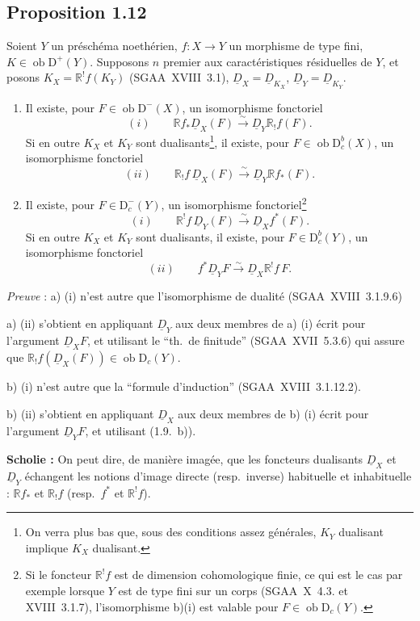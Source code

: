 \documentclass[11pt]{article}
\newcommand{\R}{\mathbb{R}}\newcommand{\RHomCore}{\mathbb{R}\mathrm{Hom}}
\newcommand{\D}{\mathrm{D}}
\newcommand{\ob}{\operatorname{ob}}
\providecommand{\ob}{\operatorname{ob}}
\providecommand{\R}{\mathrm R}
\begin{document}
\subsection*{Proposition 1.12}
Soient $Y$ un préschéma noethérien, $f : X \to Y$ un morphisme de type fini, $K \in \ob \D^{+}(Y)$. Supposons $n$ premier aux caractéristiques résiduelles de $Y$, et posons $K_X = \R^{!}f(K_Y)$ (SGAA~XVIII~3.1), $\underline{D}_X = \underline{D}_{K_X}$, $\underline{D}_Y = \underline{D}_{K_Y}$.
\begin{enumerate}
\item[a)] Il existe, pour $F \in \ob \D^{-}(X)$, un isomorphisme fonctoriel
\[
(i) \qquad \R f_{*} \underline{D}_X(F) \xrightarrow{\sim} \underline{D}_Y \R_{!}f(F).
\]
Si en
outre $K_X$ et $K_Y$ sont dualisants\footnote{On verra plus bas que, sous des conditions assez générales, $K_Y$ dualisant implique $K_X$ dualisant.}, il existe, pour $F \in \ob \D_c^{b}(X)$, un isomorphisme fonctoriel
\[
(ii) \qquad \R_{!}f \, \underline{D}_X(F) \xrightarrow{\sim} \underline{D}_Y \R f_{*}(F).
\]
\item[b)] Il existe, pour $F \in \D_c^{-}(Y)$, un isomorphisme fonctoriel\footnote{Si le foncteur $\R^{!}f$ est de dimension cohomologique finie, ce qui est le cas par exemple lorsque $Y$ est de type fini sur un corps (SGAA~X~4.3. et XVIII~3.1.7), l'isomorphisme b)(i) est valable pour $F \in \ob \D_c(Y)$.}
\[
(i) \qquad \R^{!}f \, \underline{D}_Y(F) \xrightarrow{\sim} \underline{D}_X f^{*}(F).
\]
Si en outre $K_X$ et $K_Y$ sont dualisants\footnotemark[3], il existe, pour $F \in \D_c^{b}(Y)$, un isomorphisme fonctoriel
\[
(ii) \qquad f^{*} \underline{D}_Y F \xrightarrow{\sim} \underline{D}_X \R^{!}f \, F.
\]
\end{enumerate}

\emph{Preuve} : a) (i) n'est autre que l'isomorphisme de dualité (SGAA~XVIII~3.1.9.6)

a) (ii) s'obtient en appliquant $\underline{D}_Y$ aux deux membres de a) (i) écrit pour l'argument $\underline{D}_X F$, et utilisant le ``th.~de finitude'' (SGAA~XVII~5.3.6) qui assure que $\R_{!}f(\underline{D}_X(F)) \in \ob \D_c(Y)$.

b) (i) n'est autre que la ``formule d'induction'' (SGAA~XVIII~3.1.12.2).

b) (ii) s'obtient en appliquant $\underline{D}_X$ aux deux membres de b) (i) écrit pour l'argument $\underline{D}_Y F$, et utilisant (1.9.~b)).

\textbf{Scholie :} On peut dire, de manière imagée, que les foncteurs dualisants 
$\underline{D}_X$ et $\underline{D}_Y$
échangent les notions d'image directe (resp.~inverse) habituelle et inhabituelle : $\R f_{*}$ et $\R_{!}f$ (resp.~$f^{*}$ et $\R^{!}f$).
\end{document}
